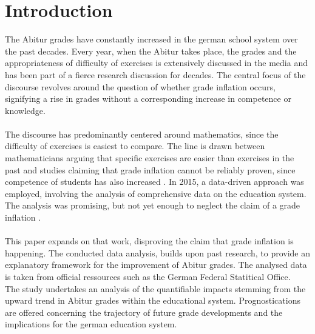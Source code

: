 \section{Introduction}
The Abitur grades have constantly increased in the german school system over the past decades. Every year, when the Abitur takes place, the grades and the appropriateness of difficulty of exercises is extensively discussed in the media and has been part of a fierce research discussion for decades. The central focus of the discourse revolves around the question of whether grade inflation occurs, signifying a rise in grades without a corresponding increase in competence or knowledge. \\\\
The discourse has predominantly centered around mathematics, since the difficulty of exercises is easiest to compare. The line is drawn between mathematicians arguing that specific exercises are easier than exercises in the past \cite{kuhnel2015modellierungskompetenz} \cite{JahnkeKleinKühnelSonarSpindler+2014+115+122} \cite{lemmermeyer2019zentralabitur} and studies claiming that grade inflation cannot be reliably proven, since competence of students has also increased \cite{Schleithoff+2015+3+26}. 
In 2015, a data-driven approach was employed, involving the analysis of comprehensive data on the education system. The analysis was promising, but not yet enough to neglect the claim of a grade inflation \cite{doi:10.7788/bue-2015-0407}.\\\\
This paper expands on that work, disproving the claim that grade inflation is happening. The conducted data analysis, builds upon past research, to provide an explanatory framework for the improvement of Abitur grades. The analysed data is taken from official ressources such as the German Federal Statitical Office. \\
The study undertakes an analysis of the quantifiable impacts stemming from the upward trend in Abitur grades within the educational system. Prognostications are offered concerning the trajectory of future grade developments and the implications for the german education system.
